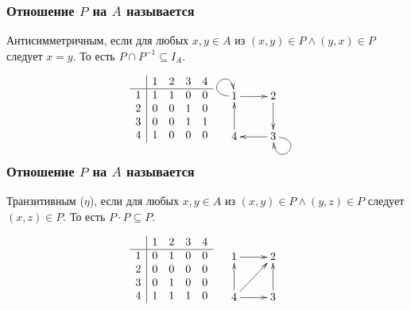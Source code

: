 \begin{frame}
    \frametitle{Отношение $P$ на $A$ называется}
    \begin{definition}
        \alert{Антисимметричным}, если для любых $x,y\in A$ из $(x,y)\in P\land(y,x)\in P$ следует $x=y$. То есть $P\cap P^{-1}\subseteq I_A$.
    \end{definition}
    \[  
        \begin{matrix}
            \begin{array}{c|cccc}
                 &1&2&3&4 \\ \hline
                1&1&1&0&0 \\
                2&0&0&1&0 \\
                3&0&0&1&1 \\
                4&1&0&0&0
            \end{array}
            &\raisebox{2\height}{
                {\xymatrix{
                    1 \ar@{->}@(l,u)[] \ar@{->}[r] 
                        &2 \ar@{->}[d]
                            \\
                    4 \ar@{->}[u]
                        &3 \ar@{->}[l] \ar@{->}@(r,d)[]
                }}
            }
        \end{matrix}
    \]    
\end{frame}


\begin{frame}
    \frametitle{Отношение $P$ на $A$ называется}
    
    \begin{definition}
        \alert{Транзитивным ($\eta$)}, если для любых $x,y\in A$ из $(x,y)\in P\land (y,z)\in P$ следует $(x,z)\in P$. То есть $P\cdot P\subseteq P$.
    \end{definition}
    \[  
        \begin{matrix}
            \begin{array}{c|cccc}
                 &1&2&3&4 \\ \hline
                1&0&1&0&0 \\
                2&0&0&0&0 \\
                3&0&1&0&0 \\
                4&1&1&1&0
            \end{array}
            &\raisebox{2\height}{
                {\xymatrix{
                    1 \ar@{->}[r] 
                        &2 
                            \\
                    4 \ar@{->}[u] \ar@{->}[r] \ar@{->}[ur]
                        &3 \ar@{->}[u]
                }}
            }
        \end{matrix}
    \]    
\end{frame}


